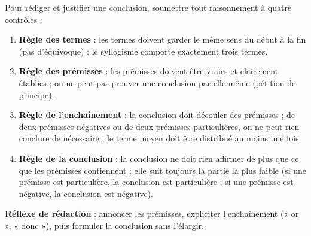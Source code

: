 \documentclass[11pt]{article}
\newcommand{\cle}[1]{{\popxbold\color{popdark}#1}}
\begin{document}
\begin{methode}
Pour rédiger et justifier une conclusion, soumettre tout raisonnement à quatre contrôles :
\begin{enumerate}
\item \textbf{Règle des termes} : les termes doivent garder le même sens du début à la fin (pas d'\cle{équivoque}) ; le syllogisme comporte exactement trois termes.
\item \textbf{Règle des prémisses} : les prémisses doivent être vraies et clairement établies ; on ne peut pas prouver une conclusion par elle-même (\cle{pétition de principe}).
\item \textbf{Règle de l'enchaînement} : la conclusion doit découler des prémisses ; de deux prémisses négatives ou de deux prémisses particulières, on ne peut rien conclure de nécessaire ; le terme moyen doit être distribué au moins une fois.
\item \textbf{Règle de la conclusion} : la conclusion ne doit rien affirmer de plus que ce que les prémisses contiennent ; elle suit toujours la partie la plus faible (si une prémisse est particulière, la conclusion est particulière ; si une prémisse est négative, la conclusion est négative).
\end{enumerate}
\textbf{Réflexe de rédaction} : annoncer les prémisses, expliciter l'enchaînement (« or », « donc »), puis formuler la conclusion sans l'élargir.
\end{methode}
\end{document}
